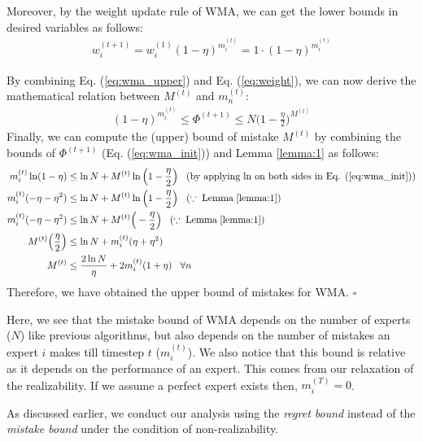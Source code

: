 \documentclass[11pt]{article}
\newcommand*{\QED}{\hfill\ensuremath{\square}}
\begin{document}
{Moreover, by the weight update rule of WMA, we can get the lower bounds in desired variables as follows:
\begin{align}
    w_i^{(t+1)} = w_i^{(1)}(1-\eta)^{m_i^{(t)}}= 1\cdot(1-\eta)^{m_i^{(t)}}\label{eq:weight}
\end{align}

By combining Eq. (\ref{eq:wma_upper}) and Eq. (\ref{eq:weight}), we can now derive the mathematical relation between $M^{(t)}$ and $m_n^{(t)}$:
\begin{align}
    (1-\eta)^{m_i^{(t)}} \leq \Phi^{(t+1)}\leq N\Big(1-\frac{\eta}{2}\Big)^{M^{(t)}} \label{eq:wma_init}
\end{align}
Finally, we can compute the (upper) bound of mistake $M^{(t)}$ by combining the bounds of $\Phi^{(t+1)}$ (Eq. (\ref{eq:wma_init})) and Lemma \ref{lemma:1} as follows:
\begin{align*}
    m_i^{(t)}\ln(1-\eta) &\leq \ln N + M^{(t)}\ln\Big(1-\frac{\eta}{2}\Big)\;\;\;(\text{by applying ln on both sides in Eq. (\ref{eq:wma_init})})\\
    m_i^{(t)}(-\eta-\eta^2) &\leq \ln N + M^{(t)}\ln\Big(1-\frac{\eta}{2}\Big)\;\;\;(\because\; \text{Lemma}\;\ref{lemma:1})\\
    m_i^{(t)}(-\eta-\eta^2) &\leq \ln N + M^{(t)}\Big(-\frac{\eta}{2}\Big)\;\;\;(\because\; \text{Lemma}\;\ref{lemma:1})\\
    M^{(t)}\Big(\frac{\eta}{2}\Big)&\leq\ln N + m_i^{(t)}(\eta+\eta^2)\\
    M^{(t)}&\leq\frac{2\ln N}{\eta} + 2m_i^{(t)}(1+\eta)\;\;\;\forall n
\end{align*}
Therefore, we have obtained the upper bound of mistakes for WMA. \QED}

Here, we see that the mistake bound of WMA depends on the number of experts ($N$) like previous algorithms, but also depends on the  number of mistakes an expert $i$ makes till timestep $t$ ($m_i^{(t)}$). We also notice that this bound is relative as it depends on the performance of an expert. This comes from our relaxation of the realizability. If we assume a perfect expert exists then, $m_i^{(T)} =0$.

As discussed earlier, we conduct our analysis using the \textit{regret bound} instead of the \textit{mistake bound} under the condition of non-realizability.
\end{document}
